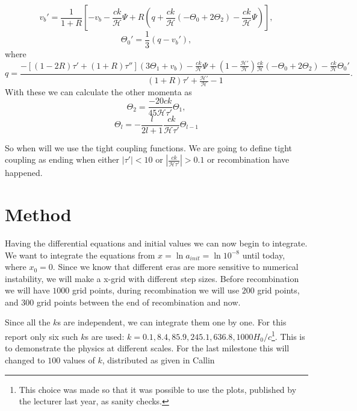 \documentclass[a4paper,norsk, 10pt]{article}
\begin{document}
\begin{equation}
v_b' = \frac{1}{1+R}\left[-v_b - \frac{ck}{\mathcal{H}}\Psi + R(q + \frac{ck}{\mathcal{H}}(-\Theta_0 + 2\Theta_2) - \frac{ck}{\mathcal{H}}\Psi)\right],
\end{equation}
\begin{equation}
\Theta_0' = \frac{1}{3}(q - v_b'),
\end{equation}
where 
\begin{equation}
q = \frac{-[(1-2R)\tau' + (1+R)\tau''](3\Theta_1 + v_b) - \frac{ck}{\mathcal{H}}\Psi + (1-\frac{\mathcal{H}'}{\mathcal{H}})\frac{ck}{\mathcal{H}}(-\Theta_0 + 2\Theta_2) - \frac{ck}{\mathcal{H}}\Theta_0'}{(1+R)\tau' + \frac{\mathcal{H}'}{\mathcal{H}} - 1}.
\end{equation}
With these we can calculate the other momenta as
\begin{equation}
\Theta_2 = \frac{-20ck}{45\mathcal{H}\tau'}\Theta_1,
\end{equation}
\begin{equation}
\Theta_l = -\frac{l}{2l+1}\frac{ck}{\mathcal{H}\tau'}\Theta_{l-1}
\end{equation}

So when will we use the tight coupling functions. We are going to define tight coupling as ending when either $|\tau'| < 10$ or $\left|\frac{ck}{\mathcal{H}\tau'}\right|>0.1$ or recombination have happened.

\section{Method}
Having the differential equations and initial values we can now begin to integrate. We want to integrate the equations from $x = \ln a_{init} = \ln 10^{-8}$ until today, where $x_0 = 0$. Since we know that different eras are more sensitive to numerical instability, we will make a x-grid with different step sizes. Before recombination we will have $1000$ grid points, during recombination we will use $200$ grid points, and $300$ grid points between the end of recombination and now. 

Since all the $k$s are independent, we can integrate them one by one. For this report only six such $k$s are used: $k = 0.1, 8.4, 85.9, 245.1, 636.8, 1000 H_0/c$\footnote{This choice was made so that it was possible to use the plots, published by the lecturer last year, as sanity checks.}. This is to demonstrate the physics at different scales. For the last milestone this will changed to $100$ values of $k$, distributed as given in Callin \cite{callin}
\end{document}
